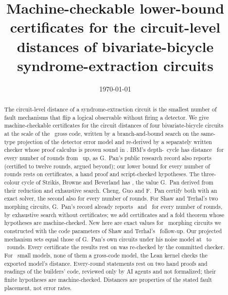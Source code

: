 \documentclass[aps,pra,twocolumn,superscriptaddress,nofootinbib,longbibliography,floatfix]{revtex4-2}
\begin{document}
\title{Machine-checkable lower-bound certificates for the circuit-level distances of bivariate-bicycle syndrome-extraction circuits}

\OwnerAuthor
\OwnerAffiliation

\date{\today}

\begin{abstract}
The circuit-level distance of a syndrome-extraction circuit is the smallest number of fault mechanisms that flip a logical observable without firing a detector. We give machine-checkable certificates for the circuit distances of four bivariate-bicycle circuits at the scale of the \GrossCode\ gross code, written by a branch-and-bound search on the same-type projection of the detector error model and re-derived by a separately written checker whose proof calculus is proven sound in \LeanName. IBM's depth-\IbmDepth\ cycle has distance \IbmD\ for every number of rounds from \IbmTmin\ up, as G.~Pan's public research record also reports (certified to twelve rounds, argued beyond); our lower bound for every number of rounds rests on certificates, a hand proof and script-checked hypotheses. The three-colour cycle of Strikis, Browne and Beverland has \TcD, the value G.~Pan derived from their reduction and exhaustive search. Cheng, Guo and F.~Pan certify both with an exact solver, the second also for every number of rounds. For Shaw and Terhal's two morphing circuits, G.~Pan's record already reports \MorphSmallD\ and \MorphBigD\ for every number of rounds, by exhaustive search without certificates; we add certificates and a fold theorem whose hypotheses are machine-checked. New here are exact values for \MtwoTargets\ morphing circuits we constructed with the code parameters of Shaw and Terhal's \STbYear\ follow-up. Our projected mechanism sets equal those of G.~Pan's own circuits under his noise model at \PanXTmin\ to \PanXTmax\ rounds. Every certificate the results rest on was re-checked by the committed checker. For \LeanKernel\ small models, none of them a gross-code model, the Lean kernel checks the exported model's distance. Every-round statements rest on two hand proofs and readings of the builders' code, reviewed only by AI agents and not formalized; their finite hypotheses are machine-checked. Distances are properties of the stated fault placement, not error rates.
\end{abstract}

\maketitle
\end{document}
